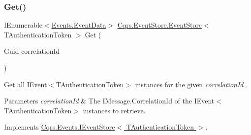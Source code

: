 \mbox{\label{classCqrs_1_1EventStore_1_1EventStore_a898b51899af27db8aa0fb0c0dc75b25d_a898b51899af27db8aa0fb0c0dc75b25d}} 
\subsubsection{\texorpdfstring{Get()}{Get()}\hspace{0.1cm}{\footnotesize\ttfamily [2/2]}}
{\footnotesize\ttfamily I\+Enumerable$<$\hyperlink{classCqrs_1_1Events_1_1EventData}{Events.\+Event\+Data}$>$ \hyperlink{classCqrs_1_1EventStore_1_1EventStore}{Cqrs.\+Event\+Store.\+Event\+Store}$<$ T\+Authentication\+Token $>$.Get (\begin{DoxyParamCaption}\item[{Guid}]{correlation\+Id }\end{DoxyParamCaption})}



Get all I\+Event$<$\+T\+Authentication\+Token$>$ instances for the given {\itshape correlation\+Id} . 


\begin{DoxyParams}{Parameters}
{\em correlation\+Id} & The I\+Message.\+Correlation\+Id of the I\+Event$<$\+T\+Authentication\+Token$>$ instances to retrieve.\\
\hline
\end{DoxyParams}


Implements \hyperlink{interfaceCqrs_1_1Events_1_1IEventStore_af398bb6768fa661ad97a9fa9ecfbd9fb_af398bb6768fa661ad97a9fa9ecfbd9fb}{Cqrs.\+Events.\+I\+Event\+Store$<$ T\+Authentication\+Token $>$}.

\mbox{\label{classCqrs_1_1EventStore_1_1EventStore_aaa4ebd61c84124425380ce31e3a67600_aaa4ebd61c84124425380ce31e3a67600}} 
